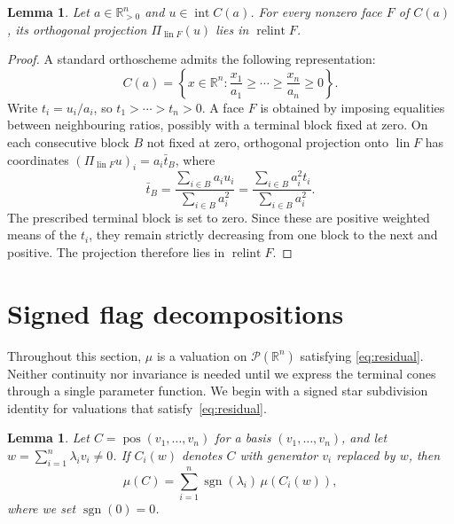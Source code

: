 \documentclass[11pt]{article}
\DeclareMathOperator{\pos}{pos}
\newcommand{\R}{\mathbb{R}}
\newcommand{\PP}{\mathcal P}
\newcommand{\lin}{\operatorname{lin}}
\DeclareMathOperator{\sgn}{sgn}
\DeclareMathOperator{\inter}{int}
\DeclareMathOperator{\relint}{relint}
\newtheorem{lemma}[theorem]{Lemma}
\begin{document}
\begin{lemma}\label{lem:positive}
Let $a\in\R_{>0}^n$ and $u\in\inter C(a)$. For every nonzero face $F$ of $C(a)$,
its orthogonal projection $\Pi_{\lin F}(u)$ lies in $\relint F$.
\end{lemma}

\begin{proof}
A standard orthoscheme admits the following representation:
\[
 C(a)=\left\{x\in\R^n\colon \frac{x_1}{a_1}\ge\cdots\ge\frac{x_n}{a_n}\ge0\right\}.
\]
Write $t_i=u_i/a_i$, so $t_1>\cdots>t_n>0$.
A face $F$ is obtained by imposing equalities between neighbouring ratios,
possibly with a terminal block fixed at zero. On each consecutive block
$B$ not fixed at zero, orthogonal projection onto $\lin F$ has coordinates
$(\Pi_{\lin F}u)_i=a_i\bar t_B$, where
\begin{equation}\label{eq:projection-positive}
 \bar t_B=\frac{\sum_{i\in B}a_i u_i}{\sum_{i\in B}a_i^2}
         =\frac{\sum_{i\in B}a_i^2t_i}{\sum_{i\in B}a_i^2}.
\end{equation}
The prescribed terminal block is set to zero. Since these are positive
weighted means of the $t_i$, they remain strictly decreasing from one
block to the next and positive. The projection therefore lies in $\relint F$.
\end{proof}

\section{Signed flag decompositions}\label{sec:signed-flags}
Throughout this section, $\mu$ is a valuation on $\PP(\R^n)$ satisfying
\eqref{eq:residual}. Neither continuity nor invariance is needed until
we express the terminal cones through a single parameter function.
We begin with a signed star subdivision identity for valuations that
satisfy~\eqref{eq:residual}.

\begin{lemma}\label{lem:star}
  Let $C=\pos(v_1,\ldots,v_n)$ for a basis $(v_1,\ldots,v_n)$, and let
  $w=\sum_{i=1}^n\lambda_i v_i\ne0$. 
  If $C_i(w)$ denotes $C$ with generator $v_i$ replaced by $w$, then
  \begin{equation}\label{eq:star}
   \mu(C)=\sum_{i=1}^n\sgn(\lambda_i)\,\mu(C_i(w)),
  \end{equation}
  where we set $\sgn(0)=0$.
\end{lemma}
\end{document}
